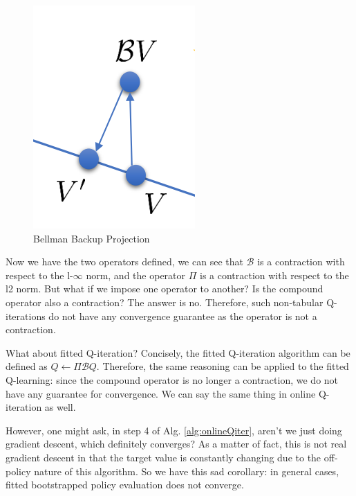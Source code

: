 \begin{figure}
    \centering
    \includegraphics[scale=0.5]{figures/bellmanbackup.png}
    \caption{Bellman Backup Projection}
    \label{fig:bellmanbackup}
\end{figure}

Now we have the two operators defined, we can see that $\mathcal{B}$ is a contraction with respect to the l-$\infty$ norm, and the operator $\Pi$ is a contraction with respect to the l2 norm. But what if we impose one operator to another? Is the compound operator also a contraction? The answer is no. Therefore, such non-tabular Q-iterations do not have any convergence guarantee as the operator is not a contraction. 

What about fitted Q-iteration? Concisely, the fitted Q-iteration algorithm can be defined as $Q \leftarrow \Pi\mathcal{B}Q$. Therefore, the same reasoning can be applied to the fitted Q-learning: since the compound operator is no longer a contraction, we do not have any guarantee for convergence. We can say the same thing in online Q-iteration as well.

However, one might ask, in step 4 of Alg. \ref{alg:onlineQiter}, aren't we just doing gradient descent, which definitely converges? As a matter of fact, this is not real gradient descent in that the target value is constantly changing due to the off-policy nature of this algorithm. So we have this sad corollary: in general cases, fitted bootstrapped policy evaluation does not converge.